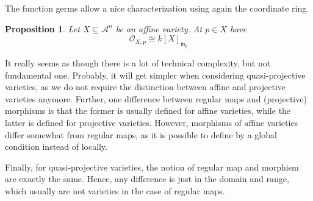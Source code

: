 \documentclass{scrartcl}
\newtheorem{prop}{Proposition}[section]
\theoremstyle{definition}
\begin{document}
The function germs allow a nice characterization using again the coordinate ring.
\begin{prop}
    Let $X \subseteq \mathcal{A}^n$ be an affine variety. At $p \in X$ have
    \begin{equation*}
        \mathcal{O}_{X, p} \cong k[X]_{\mathfrak{m}_p}
    \end{equation*} 
\end{prop}
It really seems as though there is a lot of technical complexity, but not fundamental one.
Probably, it will get simpler when considering quasi-projective varieties, as we do not require the distinction between affine and projective varieties anymore.
Further, one difference between regular maps and (projective) morphisms is that the former is usually defined for affine varieties, while the latter is defined for projective varieties.
However, morphisms of affine varieties differ somewhat from regular maps, as it is possible to define by a global condition instead of locally.

Finally, for quasi-projective varieties, the notion of regular map and morphism are exactly the same.
Hence, any difference is just in the domain and range, which usually are not varieties in the case of regular maps.
\end{document}
